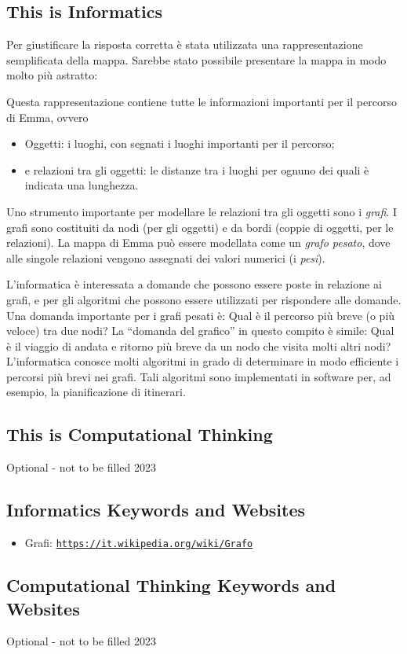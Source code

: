 \documentclass[a4paper,11pt]{report}
\newcommand{\BrochureUrlText}[1]{\texttt{#1}}
\newcommand{\taskGraphicsFolder}{..}
\begin{document}
\subsection*{This is Informatics}

Per giustificare la risposta corretta è stata utilizzata una rappresentazione semplificata della mappa.
Sarebbe stato possibile presentare la mappa in modo molto più astratto:

{\centering%
\par}

Questa rappresentazione contiene tutte le informazioni importanti per il percorso di Emma, ovvero

\begin{itemize}
  \item Oggetti: i luoghi, con segnati i luoghi importanti per il percorso;
  \item e relazioni tra gli oggetti: le distanze tra i luoghi per ognuno dei quali è indicata una lunghezza.
\end{itemize}

Uno strumento importante per modellare le relazioni tra gli oggetti sono i \emph{grafi}.
I grafi sono costituiti da nodi (per gli oggetti) e da bordi (coppie di oggetti, per le relazioni).
La mappa di Emma può essere modellata come un \emph{grafo pesato},
dove alle singole relazioni vengono assegnati dei valori numerici (i \emph{pesi}).

L’informatica è interessata a domande che possono essere poste in relazione ai grafi,
e per gli algoritmi che possono essere utilizzati per rispondere alle domande.
Una domanda importante per i grafi pesati è:
Qual è il percorso più breve (o più veloce) tra due nodi?
La \enquote{domanda del grafico} in questo compito è simile:
Qual è il viaggio di andata e ritorno più breve da un nodo che visita molti altri nodi?
L’informatica conosce molti algoritmi in grado di determinare in modo efficiente i percorsi più brevi nei grafi.
Tali algoritmi sono implementati in software per, ad esempio, la pianificazione di itinerari.


\subsection*{This is Computational Thinking}

Optional - not to be filled 2023


\subsection*{Informatics Keywords and Websites}

\begin{itemize}
  \item Grafi: \href{https://it.wikipedia.org/wiki/Grafo}{\BrochureUrlText{https://it.wikipedia.org/wiki/Grafo}}
\end{itemize}


\subsection*{Computational Thinking Keywords and Websites}

Optional - not to be filled 2023
\end{document}
